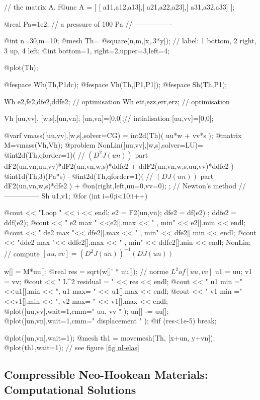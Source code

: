 \documentclass[a4paper,twoside,12pt]{book}
\begin{document}
// the matrix A.
f@unc A = [ [ a11,a12,a13],[ a21,a22,a23],[ a31,a32,a33] ];

@real Pa=1e2; //  a pressure of 100 Pa
// ----------------\hfilll

@int n=30,m=10;
@mesh Th= @square(n,m,[x,.3*y]); // label: 1 bottom, 2 right, 3 up, 4 left;
@int bottom=1, right=2,upper=3,left=4;

@plot(Th);



@fespace Wh(Th,P1dc);
@fespace Vh(Th,[P1,P1]);
@fespace Sh(Th,P1);





Wh e2,fe2,dfe2,ddfe2; // optimisation
Wh ett,ezz,err,erz; // optimisation

Vh [uu,vv], [w,s],[un,vn];
[un,vn]=[0,0];//  intialisation
[uu,vv]=[0,0];

@varf vmass([uu,vv],[w,s],solver=CG) =  int2d(Th)( uu*w + vv*s );
@matrix M=vmass(Vh,Vh);
@problem NonLin([uu,vv],[w,s],solver=LU)=
 @int2d(Th,qforder=1)( // $(D^2 J(un))$ part
                       dF2(un,vn,uu,vv)*dF2(un,vn,w,s)*ddfe2
                    +  ddF2(un,vn,w,s,uu,vv)*ddfe2
	            )
   - @int1d(Th,3)(Pa*s)
   - @int2d(Th,qforder=1)( // $(D J(un))$ part
           dF2(un,vn,w,s)*dfe2   )
   + @on(right,left,uu=0,vv=0);
;
// Newton's method
// ---------------
Sh u1,v1;
@for (int i=0;i<10;i++)
{
  @cout << "Loop " << i << endl;
  e2 = F2(un,vn);
  dfe2 = df(e2) ;
  ddfe2 = ddf(e2);
  @cout << "  e2 max " <<e2[].max << " , min" << e2[].min << endl;
  @cout << " de2 max "<< dfe2[].max << " , min" << dfe2[].min << endl;
  @cout << "dde2 max "<< ddfe2[].max << " , min" << ddfe2[].min << endl;
  NonLin; //  compute $[uu,vv] = (D^2 J(un))^{-1}(D J(un))$

  w[]   = M*uu[];
  @real res = sqrt(w[]' * uu[]); //  norme  $L^2 of [uu,vv]$
  u1 = uu;
  v1 = vv;
  @cout << " L^2 residual = " << res << endl;
  @cout << " u1 min =" <<u1[].min << ", u1 max= " << u1[].max << endl;
  @cout << " v1 min =" <<v1[].min << ", v2 max= " << v1[].max << endl;
  @plot([uu,vv],wait=1,cmm=" uu, vv " );
  un[] -= uu[];
  @plot([un,vn],wait=1,cmm=" displacement " );
  @if (res<1e-5) break;
}

@plot([un,vn],wait=1);
@mesh th1 = movemesh(Th, [x+un, y+vn]);
@plot(th1,wait=1); //  see figure \ref{fig nl-elas}
\eFF

\subsection{Compressible Neo-Hookean Materials: Computational Solutions}
\end{document}
